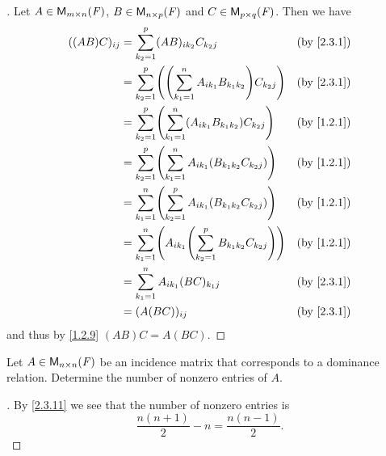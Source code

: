 \begin{proof}[]
	Let \(A \in \MS\), \(B \in \ms[n][p][\F]\) and \(C \in \ms[p][q][\F]\).
	Then we have
	\begin{align*}
		((AB) C)_{i j} & = \sum_{k_2 = 1}^p (AB)_{i k_2} C_{k_2 j}                                     &  & \by{2.3.1} \\
		               & = \sum_{k_2 = 1}^p \pa{\pa{\sum_{k_1 = 1}^n A_{i k_1} B_{k_1 k_2}} C_{k_2 j}} &  & \by{2.3.1} \\
		               & = \sum_{k_2 = 1}^p \pa{\sum_{k_1 = 1}^n (A_{i k_1} B_{k_1 k_2}) C_{k_2 j}}    &  & \by{1.2.1} \\
		               & = \sum_{k_2 = 1}^p \pa{\sum_{k_1 = 1}^n A_{i k_1} (B_{k_1 k_2} C_{k_2 j})}    &  & \by{1.2.1} \\
		               & = \sum_{k_1 = 1}^n \pa{\sum_{k_2 = 1}^p A_{i k_1} (B_{k_1 k_2} C_{k_2 j})}    &  & \by{1.2.1} \\
		               & = \sum_{k_1 = 1}^n \pa{A_{i k_1} \pa{\sum_{k_2 = 1}^p B_{k_1 k_2} C_{k_2 j}}} &  & \by{1.2.1} \\
		               & = \sum_{k_1 = 1}^n A_{i k_1} (BC)_{k_1 j}                                     &  & \by{2.3.1} \\
		               & = (A (BC))_{i j}                                                              &  & \by{2.3.1}
	\end{align*}
	and thus by \cref{1.2.9} \((AB) C = A (BC)\).
\end{proof}

\setcounter{ex}{22}
\begin{ex}\label{ex:2.3.23}
	Let \(A \in \ms[n][n][\F]\) be an incidence matrix that corresponds to a dominance relation.
	Determine the number of nonzero entries of \(A\).
\end{ex}

\begin{proof}[]
	By \cref{2.3.11} we see that the number of nonzero entries is
	\[
		\frac{n (n + 1)}{2} - n = \frac{n (n - 1)}{2}.
	\]
\end{proof}
